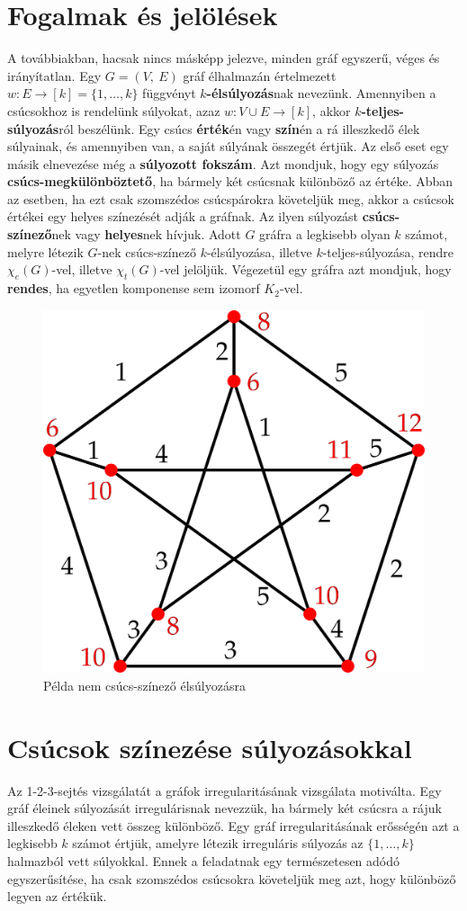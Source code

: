 \documentclass[12pt, a4paper]{report}
\theoremstyle{remark}
\theoremstyle{definition}
\begin{document}
\section{Fogalmak és jelölések}
A továbbiakban, hacsak nincs másképp jelezve, minden gráf egyszerű, véges és irányítatlan. Egy $G = (V,\ E)$ gráf élhalmazán értelmezett $w: E \rightarrow [k] = \lbrace 1, \ldots, k \rbrace$ függvényt \textbf{$k$-élsúlyozás}nak nevezünk. Amennyiben a csúcsokhoz is rendelünk súlyokat, azaz $w: V \cup E \rightarrow [k]$, akkor \textbf{$k$-teljes-súlyozás}ról beszélünk. Egy csúcs \textbf{érték}én vagy \textbf{szín}én a rá illeszkedő élek súlyainak, és amennyiben van, a saját súlyának összegét értjük. Az első eset egy másik elnevezése még a \textbf{súlyozott fokszám}. Azt mondjuk, hogy egy súlyozás \textbf{csúcs-megkülönböztető}, ha bármely két csúcsnak különböző az értéke. Abban az esetben, ha ezt csak szomszédos csúcspárokra követeljük meg, akkor a csúcsok értékei egy helyes színezését adják a gráfnak. Az ilyen súlyozást \textbf{csúcs-színező}nek vagy \textbf{helyes}nek hívjuk. Adott $G$ gráfra a legkisebb olyan $k$ számot, melyre létezik $G$-nek csúcs-színező $k$-élsúlyozása, illetve $k$-teljes-súlyozása, rendre $\chi_e(G)$-vel, illetve $\chi_t(G)$-vel jelöljük. Végezetül egy gráfra azt mondjuk, hogy \textbf{rendes}, ha egyetlen komponense sem izomorf $K_2$-vel.

\begin{figure}[!h]
\centering
\includegraphics[width=0.5\linewidth]{./images/Petersen_rossz}
\caption{Példa nem csúcs-színező élsúlyozásra}
\end{figure}


\section{Csúcsok színezése súlyozásokkal}
Az 1-2-3-sejtés vizsgálatát a gráfok irregularitásának vizsgálata motiválta. Egy gráf éleinek súlyozását irregulárisnak nevezzük, ha bármely két csúcsra a rájuk illeszkedő éleken vett összeg különböző. Egy gráf irregularitásának erősségén azt a legkisebb $k$ számot értjük, amelyre létezik irreguláris súlyozás az $\lbrace 1, \ldots, k \rbrace$ halmazból vett súlyokkal. Ennek a feladatnak egy természetesen adódó egyszerűsítése, ha csak szomszédos csúcsokra követeljük meg azt, hogy különböző legyen az értékük. 
\end{document}
